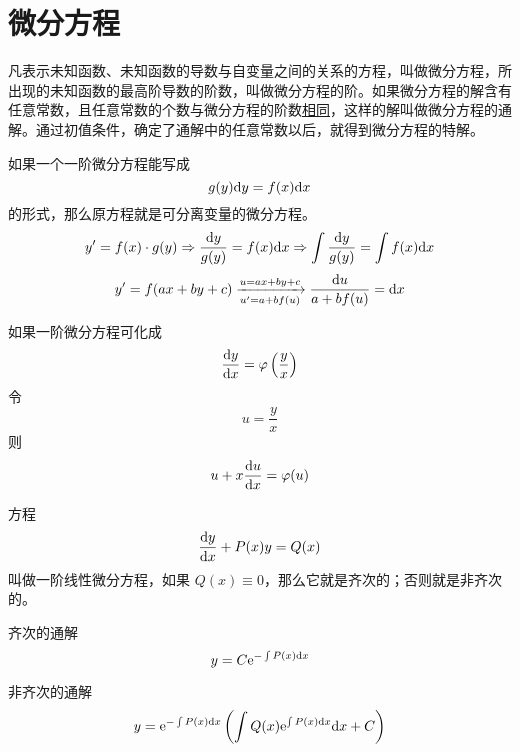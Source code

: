 \documentclass{ctexbook}
\def\diff{\textnormal{d}}
\def\e{\textnormal{e}}
\begin{document}
\chapter{微分方程}

\begin{definition}[微分方程]
    凡表示未知函数、未知函数的导数与自变量之间的关系的方程，叫做微分方程，所出现的未知函数的最高阶导数的阶数，叫做微分方程的阶。如果微分方程的解含有任意常数，且任意常数的个数与微分方程的阶数\underline{相同}，这样的解叫做微分方程的通解。通过初值条件，确定了通解中的任意常数以后，就得到微分方程的特解。
\end{definition}

\begin{definition}[可分离变量的微分方程]
    如果一个一阶微分方程能写成
    \begin{equation}
        g(y)\diff y=f(x)\diff x
    \end{equation}
    的形式，那么原方程就是可分离变量的微分方程。
    \begin{equation}
        y^\prime=f(x)\cdot g(y)\Rightarrow \frac{\diff y}{g(y)}=f(x)\diff x\Rightarrow \int \frac{\diff y}{g(y)} = \int f(x)\diff x
    \end{equation}
    \begin{equation}
        y^\prime=f(ax+by+c)\xrightarrow[u^\prime=a+bf(u)]{u=ax+by+c}\frac{\diff u}{a+bf(u)}=\diff x
    \end{equation}
\end{definition}

\begin{definition}[齐次方程]
    如果一阶微分方程可化成
    \begin{equation}
        \frac{\diff y}{\diff x}=\varphi\left(\frac{y}{x}\right)
    \end{equation}
    令
    \begin{equation}
        u=\frac{y}{x}
    \end{equation}
    则
    \begin{equation}
        u+x\frac{\diff u}{\diff x}=\varphi (u)
    \end{equation}
\end{definition}

\begin{definition}[一阶线性微分方程]
    方程
    \begin{equation}
        \frac{\diff y}{\diff x}+P(x)y=Q(x)
    \end{equation}
    叫做一阶线性微分方程，如果 $Q(x)\equiv 0$，那么它就是齐次的；否则就是非齐次的。

    齐次的通解
    \begin{equation}
        y=C\e^{-\int P(x)\diff x}
    \end{equation}

    非齐次的通解
    \marginpar{等式两边同乘 $e^{\int P(x)\diff x}$}
    \begin{equation}
        y=\e^{-\int P(x)\diff x}\left(\int Q(x)\e^{\int P(x)\diff x}\diff x+C\right)
    \end{equation}
\end{definition}
\end{document}

